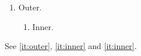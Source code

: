 \documentclass{article}
\begin{document}
\begin{enumerate}
\item Outer.\label{it:outer}
\begin{enumerate}
\item Inner.\label{it:inner}
\end{enumerate}
\end{enumerate}
See \ref{it:outer}, \ref{it:inner} and \autoref{it:inner}.
\end{document}
